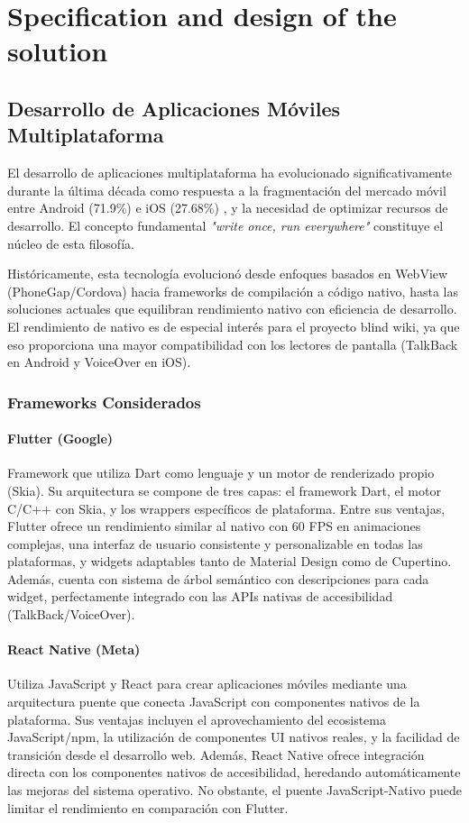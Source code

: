 \section{Specification and design of the solution}

\subsection{Desarrollo de Aplicaciones Móviles Multiplataforma}

El desarrollo de aplicaciones multiplataforma ha evolucionado significativamente durante la última década como respuesta a la fragmentación del mercado móvil entre Android (71.9\%) e iOS (27.68\%) \cite{statcounter2025}, y la necesidad de optimizar recursos de desarrollo. El concepto fundamental \textit{"write once, run everywhere"} constituye el núcleo de esta filosofía.

Históricamente, esta tecnología evolucionó desde enfoques basados en WebView (PhoneGap/Cordova) hacia frameworks de compilación a código nativo, hasta las soluciones actuales que equilibran rendimiento nativo con eficiencia de desarrollo. El rendimiento de nativo es de especial interés para el proyecto blind wiki, ya que eso proporciona una mayor compatibilidad con los lectores de pantalla (TalkBack en Android y VoiceOver en iOS).

\subsubsection{Frameworks Considerados}

\paragraph{Flutter (Google)}
Framework que utiliza Dart como lenguaje y un motor de renderizado propio (Skia). Su arquitectura se compone de tres capas: el framework Dart, el motor C/C++ con Skia, y los wrappers específicos de plataforma. Entre sus ventajas, Flutter ofrece un rendimiento similar al nativo con 60 FPS en animaciones complejas, una interfaz de usuario consistente y personalizable en todas las plataformas, y widgets adaptables tanto de Material Design como de Cupertino. Además, cuenta con sistema de árbol semántico con descripciones para cada widget, perfectamente integrado con las APIs nativas de accesibilidad (TalkBack/VoiceOver).

\paragraph{React Native (Meta)}
Utiliza JavaScript y React para crear aplicaciones móviles mediante una arquitectura puente que conecta JavaScript con componentes nativos de la plataforma. Sus ventajas incluyen el aprovechamiento del ecosistema JavaScript/npm, la utilización de componentes UI nativos reales, y la facilidad de transición desde el desarrollo web. Además, React Native ofrece integración directa con los componentes nativos de accesibilidad, heredando automáticamente las mejoras del sistema operativo. No obstante, el puente JavaScript-Nativo puede limitar el rendimiento en comparación con Flutter.



